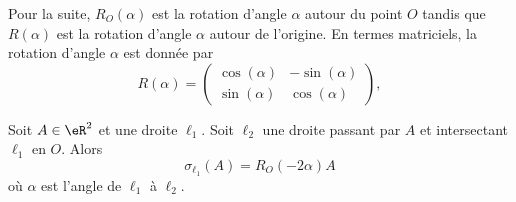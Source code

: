 \begin{normaltext}
    Pour la suite, \( R_O(\alpha)\) est la rotation d'angle \( \alpha\) autour du point \( O\) tandis que \( R(\alpha)\) est la rotation d'angle \( \alpha\) autour de l'origine. En termes matriciels, la rotation d'angle \( \alpha\) est donnée par
    \begin{equation}        \label{EQooQBEJooAHaBbJ}
        R(\alpha)=\begin{pmatrix}
            \cos(\alpha)    &   -\sin(\alpha)    \\ 
            \sin(\alpha)    &   \cos(\alpha)    
        \end{pmatrix},
    \end{equation}
\end{normaltext}

\begin{lemma}        \label{LEMooJLHGooQIpKIE}
    Soit \( A\in \eR^2\) et une droite \( \ell_1\). Soit \( \ell_2\) une droite passant par \( A\) et intersectant \( \ell_1\) en \( O\). Alors
    \begin{equation}
        \sigma_{\ell_1}(A)=R_O(-2\alpha)A
    \end{equation}
    où \( \alpha\) est l'angle de \( \ell_1\) à \( \ell_2\).
\end{lemma}

